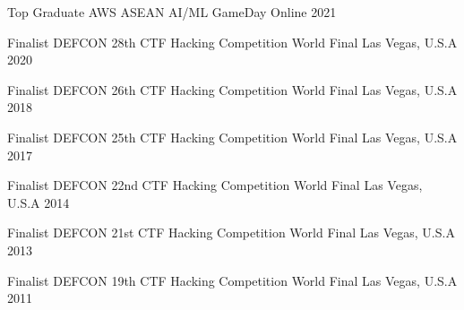 



\begin{cvhonors}

  \cvhonor
    {Top Graduate} %
    {AWS ASEAN AI/ML GameDay} %
    {Online} %
    {2021} %

  \cvhonor
    {Finalist} %
    {DEFCON 28th CTF Hacking Competition World Final} %
    {Las Vegas, U.S.A} %
    {2020} %

  \cvhonor
    {Finalist} %
    {DEFCON 26th CTF Hacking Competition World Final} %
    {Las Vegas, U.S.A} %
    {2018} %

  \cvhonor
    {Finalist} %
    {DEFCON 25th CTF Hacking Competition World Final} %
    {Las Vegas, U.S.A} %
    {2017} %

  \cvhonor
    {Finalist} %
    {DEFCON 22nd CTF Hacking Competition World Final} %
    {Las Vegas, U.S.A} %
    {2014} %

  \cvhonor
    {Finalist} %
    {DEFCON 21st CTF Hacking Competition World Final} %
    {Las Vegas, U.S.A} %
    {2013} %

  \cvhonor
    {Finalist} %
    {DEFCON 19th CTF Hacking Competition World Final} %
    {Las Vegas, U.S.A} %
    {2011} %

\end{cvhonors}


